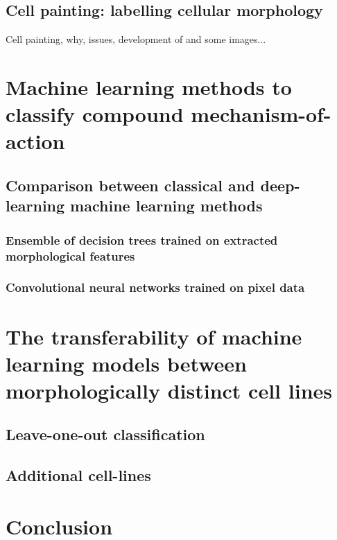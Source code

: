 \documentclass[a4paper,11pt,twoside,openright]{scrbook}
\begin{document}
\subsection{Cell painting: labelling cellular morphology}
Cell painting, why, issues, development of and some images...





\section{Machine learning methods to classify compound mechanism-of-action}

\subsection{Comparison between classical and deep-learning machine learning methods}

\subsubsection{Ensemble of decision trees trained on extracted morphological features}

\subsubsection{Convolutional neural networks trained on pixel data}


\section{The transferability of machine learning models between morphologically distinct cell lines}

\subsection{Leave-one-out classification}

\subsection{Additional cell-lines}

\section{Conclusion}

\end{document}
